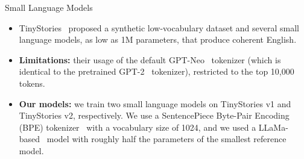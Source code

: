 \documentclass{beamer}
\begin{document}
\begin{frame}{Small Language Models}
  \begin{itemize}
    \item TinyStories~\cite{eldanTinyStoriesHowSmall2023d} proposed a synthetic low-vocabulary dataset and several small language models, as low as 1M parameters, that produce coherent English.
    \item \textbf{Limitations:} their usage of the default GPT-Neo~\cite{blackGPTNeoLargeScale2021} tokenizer (which is identical to the pretrained GPT-2~\cite{radford2019language} tokenizer), restricted to the top 10,000 tokens.
    \item \textbf{Our models:} we train two small language models on TinyStories v1 and TinyStories v2, respectively. We use a SentencePiece Byte-Pair Encoding (BPE) tokenizer~\cite{kudoSentencePieceSimpleLanguage2018} with a vocabulary size of 1024, and we used a LLaMa-based~\cite{touvronLLaMAOpenEfficient2023c} model with roughly half the parameters of the smallest reference model.
  \end{itemize}
\end{frame}
\end{document}
